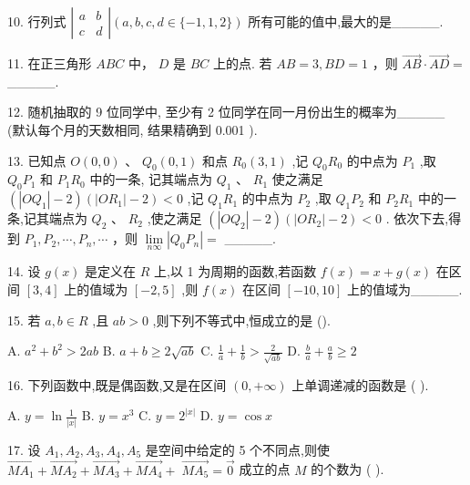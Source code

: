 \documentclass[10pt]{article}
\begin{document}
10. 行列式 \(\left| \begin{array}{ll} a & b \\  c & d \end{array}\right| \left( {a,b,c,d \in  \{  - 1,1,2\} }\right)\) 所有可能的值中,最大的是\_\_\_\_\_.

11. 在正三角形 \({ABC}\) 中， \(D\) 是 \({BC}\) 上的点. 若 \({AB} = 3,{BD} = 1\) ，则 \(\overrightarrow{AB} \cdot  \overrightarrow{AD} =\) \_\_\_\_\_.

12. 随机抽取的 9 位同学中, 至少有 2 位同学在同一月份出生的概率为\_\_\_\_\_ (默认每个月的天数相同, 结果精确到 0.001 ).

13. 已知点 \(O\left( {0,0}\right) \text{ 、 }{Q}_{0}\left( {0,1}\right)\) 和点 \({R}_{0}\left( {3,1}\right)\) ,记 \({Q}_{0}{R}_{0}\) 的中点为 \({P}_{1}\) ,取 \({Q}_{0}{P}_{1}\) 和 \({P}_{1}{R}_{0}\) 中的一条, 记其端点为 \({Q}_{1}\text{ 、 }{R}_{1}\) 使之满足 \(\left( {\left| {O{Q}_{1}}\right|  - 2}\right) \left( {\left| {O{R}_{1}}\right|  - 2}\right)  < 0\) ,记 \({Q}_{1}{R}_{1}\) 的中点为 \({P}_{2}\) ,取 \({Q}_{1}{P}_{2}\) 和 \({P}_{2}{R}_{1}\) 中的一条,记其端点为 \({Q}_{2}\text{ 、 }{R}_{2}\) ,使之满足 \(\left( {\left| {O{Q}_{2}}\right|  - 2}\right) \left( {\left| {O{R}_{2}}\right|  - 2}\right)  < 0\) . 依次下去,得到 \({P}_{1},{P}_{2},\cdots ,{P}_{n},\cdots\) ，则 \(\mathop{\lim }\limits_{{n\infty }}\left| {{Q}_{0}{P}_{n}}\right|  =\) \_\_\_\_\_.

14. 设 \(g\left( x\right)\) 是定义在 \(R\) 上,以 1 为周期的函数,若函数 \(f\left( x\right)  = x + g\left( x\right)\) 在区间 \(\left\lbrack  {3,4}\right\rbrack\) 上的值域为 \(\left\lbrack  {-2,5}\right\rbrack\) ,则 \(f\left( x\right)\) 在区间 \(\left\lbrack  {-{10},{10}}\right\rbrack\) 上的值域为\_\_\_\_\_.

15. 若 \(a,b \in  R\) ,且 \({ab} > 0\) ,则下列不等式中,恒成立的是 ().

A. \({a}^{2} + {b}^{2} > {2ab}\) B. \(a + b \geq  2\sqrt{ab}\) C. \(\frac{1}{a} + \frac{1}{b} > \frac{2}{\sqrt{ab}}\) D. \(\frac{b}{a} + \frac{a}{b} \geq  2\)

16. 下列函数中,既是偶函数,又是在区间 \(\left( {0, + \infty }\right)\) 上单调递减的函数是 ( ).

A. \(y = \ln \frac{1}{\left| x\right| }\) B. \(y = {x}^{3}\) C. \(y = {2}^{\left| x\right| }\) D. \(y = \cos x\)

17. 设 \({A}_{1},{A}_{2},{A}_{3},{A}_{4},{A}_{5}\) 是空间中给定的 5 个不同点,则使 \(\overrightarrow{M{A}_{1}} + \overrightarrow{M{A}_{2}} + \overrightarrow{M{A}_{3}} + \overrightarrow{M{A}_{4}} + \; \overrightarrow{M{A}_{5}} = \overrightarrow{0}\) 成立的点 \(M\) 的个数为 ( ).
\end{document}
